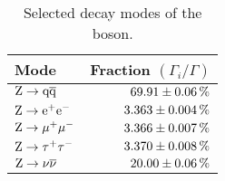 \begin{table}[h]
    \centering
    \begin{center}
        \begin{tabular}{@{}l r@{}}
            \toprule
            Mode         & Fraction $\left( \Gamma_{i} / \Gamma \right)$ \\
            \midrule
            $\text{Z} \to \text{q} \overline{\text{q}}$     & $\SI[parse-numbers=false]{69.91 \pm 0.06}{\percent}$ \\
            $\text{Z} \to \text{e}^{+} \text{e}^{-}$     & $\SI[parse-numbers=false]{3.363 \pm 0.004}{\percent}$ \\
            $\text{Z} \to \mu^{+} \mu^{-}$   & $\SI[parse-numbers=false]{3.366 \pm 0.007}{\percent}$ \\
            $\text{Z} \to \tau^{+} \tau^{-}$ & $\SI[parse-numbers=false]{3.370 \pm 0.008}{\percent}$ \\
            $\text{Z} \to \nu \overline{\nu}$   & $\SI[parse-numbers=false]{20.00 \pm 0.06}{\percent}$ \\
            \bottomrule
        \end{tabular}
        \caption{
            Selected decay modes of the \Z boson.
        }
        \label{table:z_decays}
    \end{center}
\end{table}

